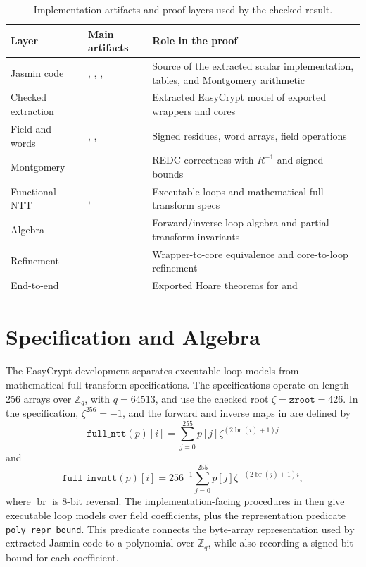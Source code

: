\documentclass[10pt,twocolumn]{article}
\newcommand{\ec}{EasyCrypt}
\newcommand{\jasmin}{Jasmin}
\newcommand{\Zq}{\mathbb{Z}_q}
\begin{document}
\begin{table}[t]
\centering
\scriptsize
\setlength{\tabcolsep}{3pt}
\begin{tabular}{P{0.29\columnwidth}P{0.31\columnwidth}P{0.30\columnwidth}}
\toprule
Layer & Main artifacts & Role in the proof \\
\midrule
\jasmin{} code & , , , 
& Source of the extracted scalar implementation, tables, and Montgomery arithmetic \\
Checked extraction & 
& Extracted \ec{} model of exported wrappers and cores \\
Field and words & , , 
& Signed residues, word arrays, field operations \\
Montgomery & 
& REDC correctness with \(R^{-1}\) and signed bounds \\
Functional NTT & , 
& Executable loops and mathematical full-transform specs \\
Algebra & 
& Forward/inverse loop algebra and partial-transform invariants \\
Refinement & 
& Wrapper-to-core equivalence and core-to-loop refinement \\
End-to-end & 
& Exported Hoare theorems for  and  \\
\bottomrule
\end{tabular}
\caption{Implementation artifacts and proof layers used by the checked result.}
\label{tab:layers}
\end{table}

\section{Specification and Algebra}

The \ec{} development separates executable loop models from mathematical full
transform specifications. The specifications operate on length-256 arrays over
\(\Zq\), with \(q=64513\), and use the checked root
\(\zeta=\texttt{zroot}=426\). In the specification, \(\zeta^{256}=-1\), and the
forward and inverse maps in  are defined by
\[
  \texttt{full\_ntt}(p)[i] =
    \sum_{j=0}^{255} p[j]\zeta^{(2\operatorname{br}(i)+1)j}
\]
and
\[
  \texttt{full\_invntt}(p)[i] =
    256^{-1}\sum_{j=0}^{255}
      p[j]\zeta^{-(2\operatorname{br}(j)+1)i},
\]
where \(\operatorname{br}\) is 8-bit reversal. The implementation-facing
procedures in  then give executable loop models over field
coefficients, plus the representation predicate
\texttt{poly\_repr\_bound}. This predicate connects the byte-array
representation used by extracted \jasmin{} code to a polynomial over \(\Zq\),
while also recording a signed bit bound for each coefficient.
\end{document}
